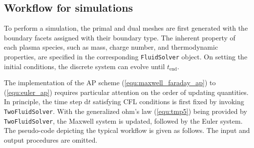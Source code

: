 \documentclass{report}
\begin{document}
\begin{appendices}
\section{Workflow for simulations}
To perform a simulation, the primal and dual meshes are first generated with the boundary facets assigned with their boundary type. The inherent property of each plasma species, such as mass, charge number, and thermodynamic properties, are specified in the corresponding \texttt{FluidSolver} object. On setting the initial conditions, the discrete system can evolve until $t_{\text{end}}$. 

The implementation of the AP scheme (\ref{equ:maxwell_faraday_ap}) to (\ref{equ:euler_ap}) requires particular attention on the order of updating quantities. In principle, the time step d$t$ satisfying CFL conditions is first fixed by invoking \texttt{TwoFluidSolver}. With the generalized ohm's law (\ref{equ:tmp5}) being provided by \texttt{TwoFluidSolver}, the Maxwell system is updated, followed by the Euler system. The pseudo-code depicting the typical workflow is given as follows. The input and output procedures are omitted.

\vspace{0.5cm}
\begin{minipage}{0.9\textwidth}
\end{minipage}
\end{appendices}


\end{document}
